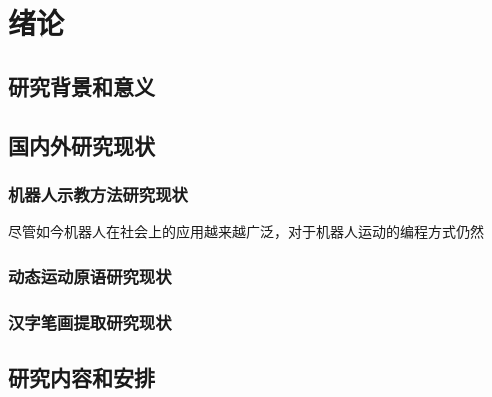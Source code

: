 \chapter{绪论}
\section{研究背景和意义}





\section{国内外研究现状}
\subsection{机器人示教方法研究现状}
尽管如今机器人在社会上的应用越来越广泛，对于机器人运动的编程方式仍然




\subsection{动态运动原语研究现状}

\subsection{汉字笔画提取研究现状}

\section{研究内容和安排}


